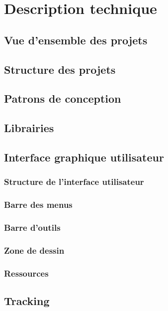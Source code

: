 \documentclass[11pt,a4paper,oldfontcommands]{memoir}
\begin{document}
\chapter{Description technique}

\section{Vue d'ensemble des projets}

\section{Structure des projets}

\section{Patrons de conception}

\section{Librairies}

\section{Interface graphique utilisateur}

\subsection{Structure de l'interface utilisateur}

\subsection{Barre des menus}

\subsection{Barre d'outils}

\subsection{Zone de dessin}

\subsection{Ressources}

\section{Tracking}
\end{document}
